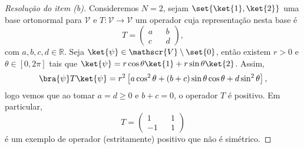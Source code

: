 \begin{proof}[Resolução do item (b)]
    Consideremos \(N = 2\), sejam \(\set{\ket{1},\ket{2}}\) uma base ortonormal para \(\mathscr{V}\) e \(T : \mathscr{V} \to \mathscr{V}\) um operador cuja representação nesta base é
    \begin{equation*}
        T = \begin{pmatrix}
            a && b\\
            c && d
        \end{pmatrix},
    \end{equation*}
    com \(a,b,c,d \in \mathbb{R}\). Seja \(\ket{\psi} \in \mathscr{V}\setminus\set{0}\), então existem \(r > 0\) e \(\theta \in [0, 2\pi]\) tais que \(\ket{\psi} = r\cos\theta\ket{1} + r\sin\theta \ket{2}\). Assim,
    \begin{equation*}
        \bra{\psi}T\ket{\psi} = r^2\left[a \cos^2\theta + (b + c)\sin\theta\cos\theta + d \sin^2\theta\right],
    \end{equation*}
    logo vemos que ao tomar \(a = d \geq 0\) e \(b + c = 0\), o operador \(T\) é positivo. Em particular,
    \begin{equation*}
        T = \begin{pmatrix}
            1 && 1\\
            -1&& 1
        \end{pmatrix}
    \end{equation*}
    é um exemplo de operador (estritamente) positivo que não é simétrico.
\end{proof}
